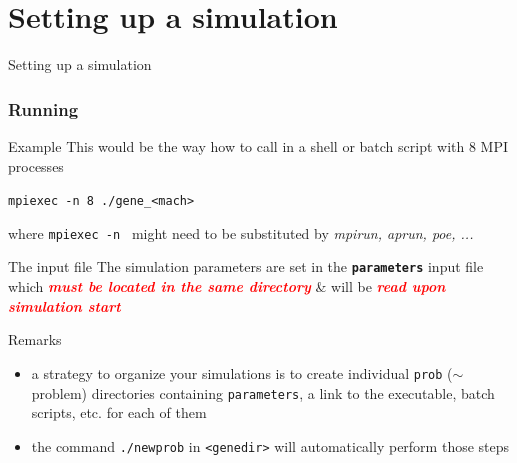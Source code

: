 \documentclass[9pt]{beamer}
\newcommand{\cR}[1]{\textcolor{red}{#1}}
\begin{document}

\section{Setting up a simulation}

\begin{frame}[plain]

\begin{center}

\begin{exampleblock}

\begin{center}
\LARGE
Setting up a simulation%
\end{center}
\end{exampleblock}

\end{center}
\end{frame}


\begin{frame}[fragile]
   \frametitle{Running \gene}

\begin{exampleblock}{Example}
This would be the way how to call \gene in a shell or batch script with 8 MPI processes

\verb|mpiexec -n 8 ./gene_<mach>|

where \verb|mpiexec -n | might need to be substituted by {\em mpirun, aprun, poe, ...}
\end{exampleblock}

\begin{alertblock}{The input file}
The simulation parameters are set in the {\bf \tt parameters} input file which \cR{\bf \em must be located in the same directory} \& will be \cR{\bf\em read upon simulation start}
\end{alertblock}

\begin{block}{Remarks}
\begin{itemize}
 \item a strategy to organize your simulations is to create individual {\tt prob} ($\sim$ problem) directories containing {\tt parameters}, a link to the executable, batch scripts, etc. for each of them
 \item the command {\tt ./newprob} in {\tt <genedir>} will automatically perform those steps
\end{itemize}

\end{block}
\end{frame}
\end{document}
